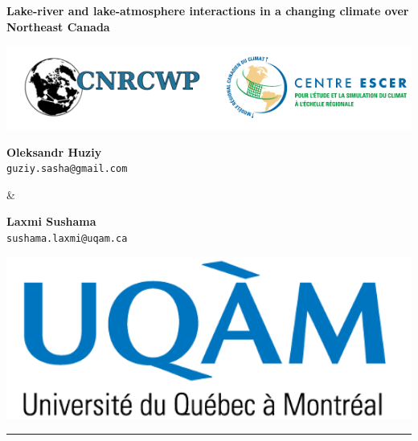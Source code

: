 \documentclass[a0,landscape]{a0poster}
\begin{document}


\noindent\begin{minipage}[b]{\linewidth}
\centering
\noindent \veryHuge \color{NavyBlue} \textbf{Lake-river and lake-atmosphere interactions in a changing climate over Northeast Canada} \color{Black}\\ %
\noindent\begin{minipage}[c]{0.2\linewidth}
      \center
      \includegraphics[width=25cm]{logo_cnrcwp_escer.png} %
\end{minipage} \hfill
%
\begin{minipage}[c]{0.15\linewidth}
  \center
  \Large \textbf{Oleksandr Huziy} \\
  \large \texttt{guziy.sasha@gmail.com}
\end{minipage}
%
\begin{minipage}[b]{0.01\linewidth}
 \center
 \Large\&
\end{minipage}
%
\begin{minipage}[c]{0.15\linewidth}
   \center
   \Large \textbf{Laxmi Sushama} \\
   \large  \texttt{sushama.laxmi@uqam.ca}
\end{minipage}\hfill
%
\begin{minipage}[c]{0.2\linewidth}
  \center
  \includegraphics[width=15cm]{logo_uqam.png} %
\end{minipage}
\rule{\linewidth}{3pt}
\end{minipage}
%
\end{document}
